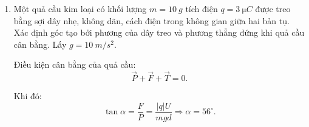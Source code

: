 \begin{enumerate}[label=\bfseries Câu \arabic*:]
{\begin{enumerate}
			$$U=\dfrac{Q}{C} = \SI{200}{V}.$$
			
			\item Một quả cầu kim loại có khối lượng $m=\SI{10}{g}$ tích điện $q=\SI{3}{\micro C}$ được treo bằng sợi dây nhẹ, không dãn, cách điện trong không gian giữa hai bản tụ. Xác định góc tạo bởi phương của dây treo và phương thẳng đứng khi quả cầu cân bằng. Lấy $g=\SI{10}{m/s^2}$.
			
			Điều kiện cân bằng của quả cầu:
			$$\vec P + \vec F + \vec T = 0.$$
			
			Khi đó:
			$$\tan \alpha = \dfrac{F}{P} = \dfrac{|q|U}{mgd} \Rightarrow \alpha = 56^\circ .$$
		\end{enumerate}
		
	}
	
\end{enumerate}